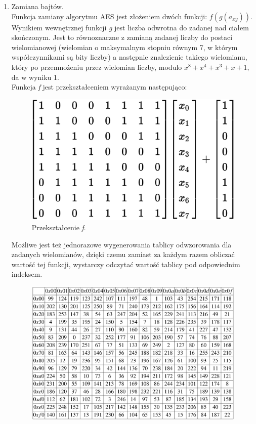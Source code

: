 \begin{enumerate}
	\item Zamiana bajtów. \\
			Funkcja zamiany algorytmu AES jest złożeniem dwóch funkcji: $f(g(a_{xy})).$ \\
			Wynikiem wewnętrznej funkcji \textit{g} jest liczba odwrotna do zadanej nad ciałem skończonym.
			Jest to równoznaczne z zamianą zadanej liczby do postaci wielomianowej (wielomian o maksymalnym 
			stopniu równym 7, w którym współczynnikami są bity liczby) a następnie znalezienie takiego
			wielomianu, który po przemnożeniu przez wielomian liczby, modulo $x^8+x^4+x^3+x+1$, da w wyniku 1. \\
			Funkcja \textit{f} jest przekształceniem wyrażanym następująco: \\
			\begin{figure}[H]
			    \centering
			    \includegraphics[scale=0.5]{content/images/affin}
				\caption{Przekształcenie \textit{f}.}
			\end{figure}
			Możliwe jest też jednorazowe wygenerowania tablicy odwzorowania dla zadanych wielomianów,
			dzięki czemu zamiast za każdym razem obliczać wartość tej funkcji, wystarczy odczytać wartość tablicy
			pod odpowiednim indeksem. 
			\begin{figure}[H]
			    \centering
			    \includegraphics[width=\textwidth]{content/images/sbox}

\end{figure}
\end{enumerate}
